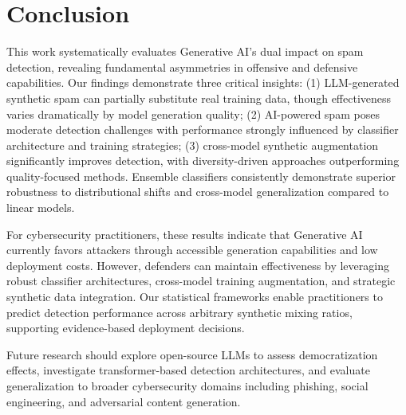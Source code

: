 \section{Conclusion}
\label{sec:conclusion}

This work systematically evaluates Generative AI's dual impact on spam detection, revealing fundamental asymmetries in offensive and defensive capabilities. Our findings demonstrate three critical insights: (1) LLM-generated synthetic spam can partially substitute real training data, though effectiveness varies dramatically by model generation quality; (2) AI-powered spam poses moderate detection challenges with performance strongly influenced by classifier architecture and training strategies; (3) cross-model synthetic augmentation significantly improves detection, with diversity-driven approaches outperforming quality-focused methods. Ensemble classifiers consistently demonstrate superior robustness to distributional shifts and cross-model generalization compared to linear models.

For cybersecurity practitioners, these results indicate that Generative AI currently favors attackers through accessible generation capabilities and low deployment costs. However, defenders can maintain effectiveness by leveraging robust classifier architectures, cross-model training augmentation, and strategic synthetic data integration. Our statistical frameworks enable practitioners to predict detection performance across arbitrary synthetic mixing ratios, supporting evidence-based deployment decisions.

Future research should explore open-source LLMs to assess democratization effects, investigate transformer-based detection architectures, and evaluate generalization to broader cybersecurity domains including phishing, social engineering, and adversarial content generation.
